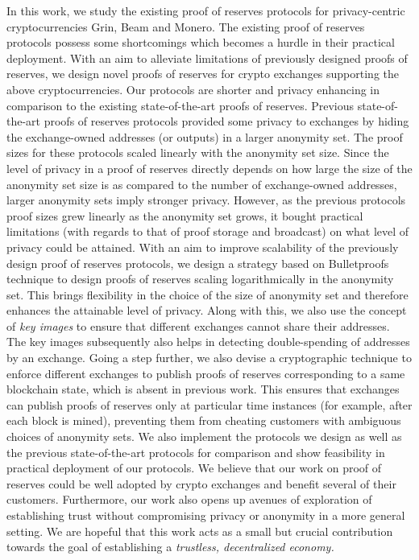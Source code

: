 \begin{Abstract}
In this work, we study the existing proof of reserves protocols for privacy-centric cryptocurrencies Grin, Beam and Monero.
The existing proof of reserves protocols possess some shortcomings which becomes a hurdle in their practical deployment.
With an aim to alleviate limitations of previously designed proofs of reserves, we design novel proofs of reserves for crypto exchanges supporting the above cryptocurrencies.
Our protocols are shorter and privacy enhancing in comparison to the existing state-of-the-art proofs of reserves.
Previous state-of-the-art proofs of reserves protocols provided some privacy to exchanges by hiding the exchange-owned addresses (or outputs) in a larger anonymity set. 
The proof sizes for these protocols scaled linearly with the anonymity set size.
Since the level of privacy in a proof of reserves directly depends on how large the size of the anonymity set size is as compared to the number of exchange-owned addresses, larger anonymity sets imply stronger privacy.
However, as the previous protocols proof sizes grew linearly as the anonymity set grows, it bought practical limitations (with regards to that of proof storage and broadcast) on what level of privacy could be attained.  
With an aim to improve scalability of the previously design proof of reserves protocols, we design a strategy based on Bulletproofs technique \cite{Bunz2018} to design proofs of reserves scaling logarithmically in the anonymity set.
This brings flexibility in the choice of the size of anonymity set and therefore enhances the attainable level of privacy.
Along with this, we also use the concept of \textit{key images} to ensure that different exchanges cannot share their addresses.
The key images subsequently also helps in detecting double-spending of addresses by an exchange.
Going a step further, we also devise a cryptographic technique to enforce different exchanges to publish proofs of reserves corresponding to a same blockchain state, which is absent in previous work.
This ensures that exchanges can publish proofs of reserves only at particular time instances (for example, after each block is mined), preventing them from cheating customers with ambiguous choices of anonymity sets.   
We also implement the protocols we design as well as the previous state-of-the-art protocols for comparison and show feasibility in practical deployment of our protocols.
We believe that our work on proof of reserves could be well adopted by crypto exchanges and benefit several of their customers.
Furthermore, our work also opens up avenues of exploration of establishing trust without compromising privacy or anonymity in a more general setting.
We are hopeful that this work acts as a small but crucial contribution towards the goal of establishing a \textit{trustless, decentralized economy.}
%
%
%
%
%
\end{Abstract}

